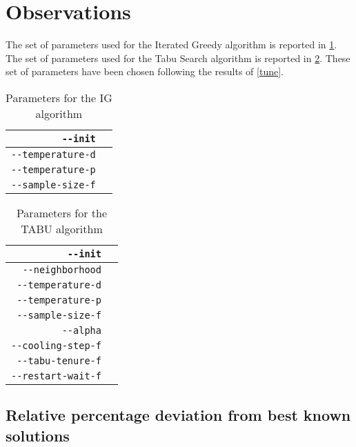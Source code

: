 \newpage\cleardoublepage{}
\section{Observations}

The set of parameters used for the Iterated Greedy algorithm is reported in \ref{obs:table/ig-tune}. 
The set of parameters used for the Tabu Search algorithm is reported in \ref{obs:table/tabu-tune}. These set of parameters have been chosen following the results of \ref{tune}.


\begin{table}[H]
\begin{center}
\caption{Parameters for the IG algorithm}
\label{obs:table/ig-tune}
\begin{tabular}{|r|c|}
\hline
\verb!--init! & \\
\hline
\verb!--temperature-d! & \\
\hline
\verb!--temperature-p! & \\
\hline
\verb!--sample-size-f! & \\
\hline
\end{tabular}
\end{center}
\end{table}


\begin{table}[H]
\begin{center}
\caption{Parameters for the TABU algorithm}
\label{obs:table/tabu-tune}
\begin{tabular}{|r|c|}
\hline
\verb!--init! & \\
\hline
\verb!--neighborhood! & \\
\hline
\verb!--temperature-d! & \\
\hline
\verb!--temperature-p! & \\
\hline
\verb!--sample-size-f! & \\
\hline
\verb!--alpha! & \\
\hline
\verb!--cooling-step-f! & \\
\hline
\verb!--tabu-tenure-f! & \\
\hline
\verb!--restart-wait-f! & \\
\hline
\end{tabular}
\end{center}
\end{table}



\subsection{Relative percentage deviation from best known solutions}

